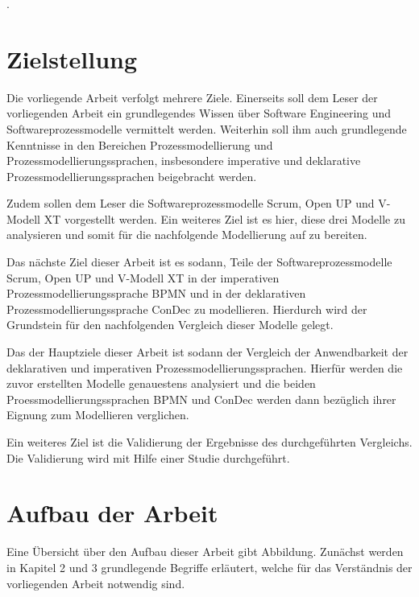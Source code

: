 .


\section{Zielstellung}
Die vorliegende Arbeit verfolgt mehrere Ziele. Einerseits soll dem Leser der vorliegenden Arbeit ein grundlegendes Wissen über Software Engineering und Softwareprozessmodelle vermittelt werden. Weiterhin soll ihm auch grundlegende Kenntnisse in den Bereichen Prozessmodellierung und Prozessmodellierungssprachen, insbesondere imperative und deklarative Prozessmodellierungssprachen beigebracht werden. \newline

Zudem sollen dem Leser die Softwareprozessmodelle Scrum, Open UP und V-Modell XT vorgestellt werden. Ein weiteres Ziel ist es hier, diese drei Modelle zu analysieren und somit für die nachfolgende Modellierung auf zu bereiten.\newline

Das nächste Ziel dieser Arbeit ist es sodann, Teile der Softwareprozessmodelle Scrum, Open UP und V-Modell XT in der imperativen Prozessmodellierungssprache BPMN und in der deklarativen Prozessmodellierungssprache ConDec zu modellieren. Hierdurch wird der Grundstein für den nachfolgenden Vergleich dieser Modelle gelegt.\newline

Das der Hauptziele dieser Arbeit ist sodann der Vergleich der Anwendbarkeit der deklarativen und imperativen Prozessmodellierungssprachen. Hierfür werden die zuvor erstellten Modelle genauestens analysiert und die beiden Proessmodellierungssprachen BPMN und ConDec werden dann bezüglich ihrer Eignung zum Modellieren verglichen.\newline

Ein weiteres Ziel ist die Validierung der Ergebnisse des durchgeführten Vergleichs. Die Validierung wird mit Hilfe einer Studie durchgeführt.\newline





\section{Aufbau der Arbeit}

Eine Übersicht über den Aufbau dieser Arbeit gibt Abbildung.
Zunächst werden in Kapitel 2 und 3 grundlegende Begriffe erläutert, welche für das Verständnis der vorliegenden Arbeit notwendig sind.\newline

